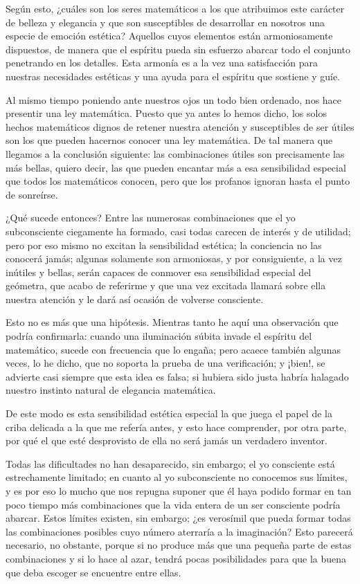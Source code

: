 \documentclass[a4paper, 12pt, draft]{article}
\begin{document}
Según esto, ¿cuáles son los seres matemáticos a los que
atribuimos este carácter de belleza y elegancia y que son susceptibles
de desarrollar en nosotros una especie de emoción estética? Aquellos
cuyos elementos están armoniosamente dispuestos, de manera que el espíritu pueda sin esfuerzo abarcar todo el conjunto penetrando en los
detalles. Esta armonía es a la vez una satisfacción para nuestras
necesidades estéticas y una ayuda para el espíritu que sostiene y guíe.

 Al mismo tiempo poniendo ante nuestros ojos un todo bien ordenado, nos hace presentir
una ley matemática. Puesto que ya antes lo hemos dicho, los solos hechos
matemáticos dignos de retener nuestra atención y susceptibles de ser 
útiles son los que pueden hacernos conocer una ley matemática. De
tal manera que llegamos a la conclusión siguiente: las combinaciones 
útiles son precisamente las más bellas, quiero decir, las que pueden
encantar más a esa sensibilidad especial que todos los matemáticos
conocen, pero que los profanos ignoran hasta el punto de sonreírse.

¿Qué sucede entonces? Entre las numerosas combinaciones que el yo
subconsciente ciegamente ha formado, casi todas carecen de interés y de
utilidad; pero por eso mismo no excitan la sensibilidad estética; la
conciencia no las conocerá jamás; algunas solamente son armoniosas,
y por consiguiente, a la vez inútiles y bellas, serán capaces de
conmover esa sensibilidad especial del geómetra, que acabo de referirme
y que una vez excitada llamará sobre ella nuestra atención y le dará así ocasión de volverse consciente.

Esto no es más que una hipótesis. Mientras tanto he aquí una
observación que podría confirmarla: cuando una iluminación súbita invade el espíritu del matemático, sucede con frecuencia
que lo engaña; pero acaece también algunas veces, lo he dicho, que
no soporta la prueba de una verificación; y ¡bien!, se advierte casi
siempre que esta idea es falsa; si hubiera sido justa habría halagado
nuestro instinto natural de elegancia matemática.

De este modo es esta sensibilidad estética especial la que juega el
papel de la criba delicada a la que me refería antes, y esto hace
comprender, por otra parte, por qué el que esté desprovisto de ella
no será jamás un verdadero inventor.

Todas las dificultades no han desaparecido, sin embargo; el yo consciente
está estrechamente limitado; en cuanto al yo subconsciente no conocemos
sus límites, y es por eso lo mucho que nos repugna suponer que él
haya podido formar en tan poco tiempo más combinaciones que la vida
entera de un ser consciente podría abarcar. Estos límites existen,
sin embargo; ¿es verosímil que pueda formar todas las combinaciones
posibles cuyo número aterraría a la imaginación? Esto
parecerá necesario, no obstante, porque si no produce más que una
pequeña parte de estas combinaciones y si lo hace al azar, tendrá
pocas posibilidades para que la buena que deba escoger se encuentre entre
ellas.
\end{document}
